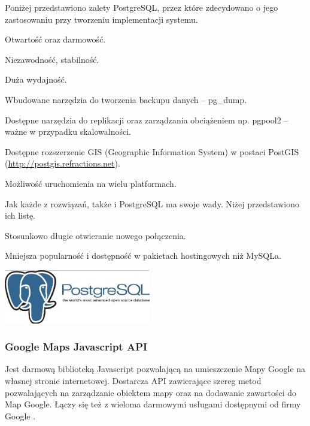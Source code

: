 Poniżej przedstawiono zalety PostgreSQL, przez które zdecydowano o jego zastosowaniu przy tworzeniu implementacji systemu.
\begin{packed_item}
    \item{Otwartość oraz darmowość.}
    \item{Niezawodność, stabilność.}
    \item{Duża wydajność.}
    \item{Wbudowane narzędzia do tworzenia backupu danych -- pg\_dump.}
    \item{Dostępne narzędzia do replikacji oraz zarządzania obciążeniem np. pgpool2 -- ważne w przypadku skalowalności.}
    \item{Dostępne rozszerzenie GIS (Geographic Information System) w postaci PostGIS (\url{http://postgis.refractions.net}).}
    \item{Możliwość uruchomienia na wielu platformach.}
\end{packed_item}

Jak każde z rozwiązań, także i PostgreSQL ma swoje wady. Niżej przedstawiono ich listę.
\begin{packed_item}
    \item{Stosunkowo długie otwieranie nowego połączenia.}
    \item{Mniejsza popularność i dostępność w pakietach hostingowych niż MySQLa.}
\end{packed_item}

\begin{center}
    \includegraphics[width=0.48\textwidth]{img/logos/postgresql.jpg}
\end{center}

\newpage
\subsubsection{Google Maps Javascript API}
Jest darmową biblioteką Javascript pozwalającą na umieszczenie Mapy Google na własnej stronie internetowej. Dostarcza API zawierające szereg metod pozwalających na zarządzanie obiektem mapy oraz na dodawanie zawartości do Map Google. Łączy się też z wieloma darmowymi usługami dostępnymi od firmy Google  \cite{GoogleMapsJsAPI}.

